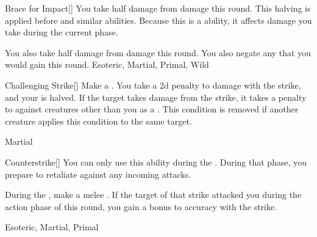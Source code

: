 \lowercase{\hypertarget{maneuver:Brace for Impact}{}}\label{maneuver:Brace for Impact}
\hypertarget{maneuver:Brace for Impact}{}
\begin{freeability}[Rank 2]{Brace for Impact}[]
You take half damage from  damage this round.
This halving is applied before  and similar abilities.
Because this is a  ability, it affects damage you take during the current phase.

\rankline
{} You also take half damage from  damage this round.
 You also negate any  that you would gain this round.
 Esoteric, Martial, Primal, Wild
\end{freeability}
\vspace{0.25em}



\lowercase{\hypertarget{maneuver:Challenging Strike}{}}\label{maneuver:Challenging Strike}
\hypertarget{maneuver:Challenging Strike}{}
\begin{freeability}[Rank 2]{Challenging Strike}[]
Make a .
You take a \minus2d penalty to damage with the strike, and your  is halved.
If the target takes damage from the strike, it takes a  penalty to  against creatures other than you as a .
This condition is removed if another creature applies this condition to the same target.


 Martial
\end{freeability}
\vspace{0.25em}



\lowercase{\hypertarget{maneuver:Counterstrike}{}}\label{maneuver:Counterstrike}
\hypertarget{maneuver:Counterstrike}{}
\begin{freeability}[Rank 2]{Counterstrike}[]
You can only use this ability during the .
During that phase, you prepare to retaliate against any incoming attacks.

During the , make a melee .
If the target of that strike attacked you during the action phase of this round,
you gain a  bonus to accuracy with the strike.


 Esoteric, Martial, Primal
\end{freeability}
\vspace{0.25em}



